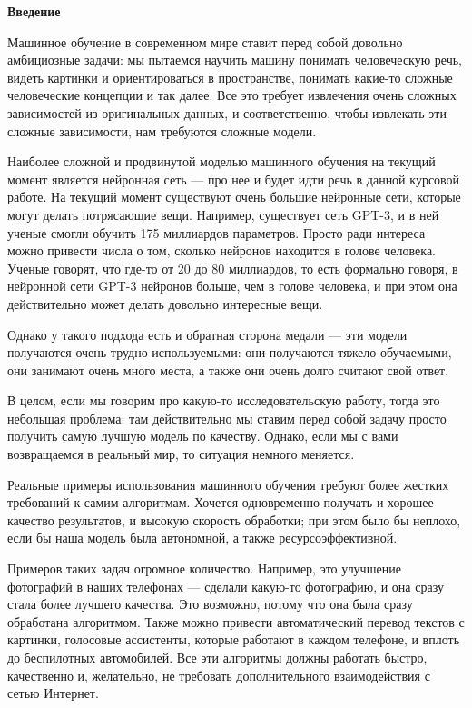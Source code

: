 \documentclass[oneside,final,12pt]{extreport}
\begin{document}
\tableofcontents
\newpage
\textbf{Введение}

Машинное обучение в современном мире ставит перед собой довольно амбициозные задачи: мы пытаемся научить машину понимать человеческую речь, видеть картинки и ориентироваться в пространстве, понимать какие-то сложные человеческие концепции и так далее. Все это требует извлечения очень сложных зависимостей из оригинальных данных,  и соответственно, чтобы извлекать эти сложные зависимости, нам требуются сложные модели.

Наиболее сложной и продвинутой моделью машинного обучения  на текущий момент является нейронная сеть — про нее и будет идти речь в данной курсовой работе.  На текущий момент существуют очень большие нейронные сети, которые могут делать потрясающие вещи.  Например, существует сеть GPT-3, и в ней ученые смогли обучить 175 миллиардов параметров. Просто ради интереса можно привести числа о том, сколько нейронов находится в голове человека. Ученые говорят, что где-то от 20 до 80 миллиардов, то есть формально говоря, в нейронной сети GPT-3 нейронов больше, чем в голове человека, и при этом она действительно может делать довольно интересные вещи. 

Однако у такого подхода есть и обратная сторона медали — эти модели получаются очень трудно используемыми: они получаются тяжело обучаемыми, они занимают очень много места, а также они очень долго считают свой ответ.

В целом, если мы говорим про какую-то исследовательскую работу, тогда это небольшая проблема: там действительно мы ставим перед собой задачу просто получить самую лучшую модель по качеству. Однако, если мы с вами возвращаемся в реальный мир, то ситуация немного меняется. 

Реальные примеры использования машинного обучения требуют более жестких требований к самим алгоритмам. Хочется одновременно получать и хорошее качество результатов, и высокую скорость обработки; при этом было бы неплохо, если бы наша модель была автономной, а также ресурсоэффективной. 

Примеров таких задач огромное количество. Например, это улучшение фотографий в наших телефонах — сделали какую-то фотографию, и она сразу стала более лучшего качества. Это возможно, потому что она была сразу обработана алгоритмом. Также можно привести автоматический перевод текстов с картинки, голосовые ассистенты, которые работают в каждом телефоне, и вплоть до беспилотных автомобилей. Все эти алгоритмы должны работать быстро, качественно и, желательно, не требовать дополнительного взаимодействия с сетью Интернет.
\end{document}
